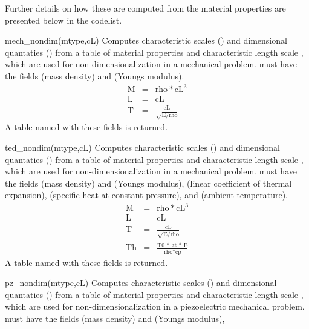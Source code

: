 Further details on how these are computed from the material 
properties are presented below in the codelist.
\begin{codelist}
  \item[mech\_nondim(mtype,cL)]
    Computes characteristic scales () and dimensional 
    quantaties () from a 
    table of material properties  and characteristic length
    scale , which are used for non-dimensionalization in a 
    mechanical problem.  must have the fields 
    (mass density) and  (Youngs modulus).
    \begin{eqnarray}
      \text{M} &=& \text{rho} * \text{cL}^3 \nonumber \\ 
      \text{L} &=& \text{cL}                \nonumber \\
      \text{T} &=& \frac{\text{cL}}{\sqrt{\text{E/rho}}} \nonumber 
    \end{eqnarray}
    A table named  with these fields is returned. 
  \item[ted\_nondim(mtype,cL)] 
    Computes characteristic scales () and dimensional 
    quantaties () from a 
    table of material properties  and characteristic length
    scale , which are used for non-dimensionalization in a 
    mechanical problem.  must have the fields 
    (mass density) and  (Youngs modulus),
    (linear coefficient of thermal expansion), 
    (specific heat at constant pressure),
    and (ambient temperature).
    \begin{eqnarray}
      \text{M} &=& \text{rho} * \text{cL}^3 \nonumber \\ 
      \text{L} &=& \text{cL}                \nonumber \\
      \text{T} &=& \frac{\text{cL}}{\sqrt{\text{E/rho}}} \nonumber \\
      \text{Th}&=& \frac{\text{T0 * at * E}}{\text{rho*cp}} \nonumber
    \end{eqnarray}
    A table named  with these fields is returned.
  \item[pz\_nondim(mtype,cL)] 
    Computes characteristic scales () and dimensional 
    quantaties () from a 
    table of material properties  and characteristic length
    scale , which are used for non-dimensionalization in a 
    piezoelectric mechanical problem.  must have the fields 
    (mass density) and  (Youngs modulus),

\end{codelist}
